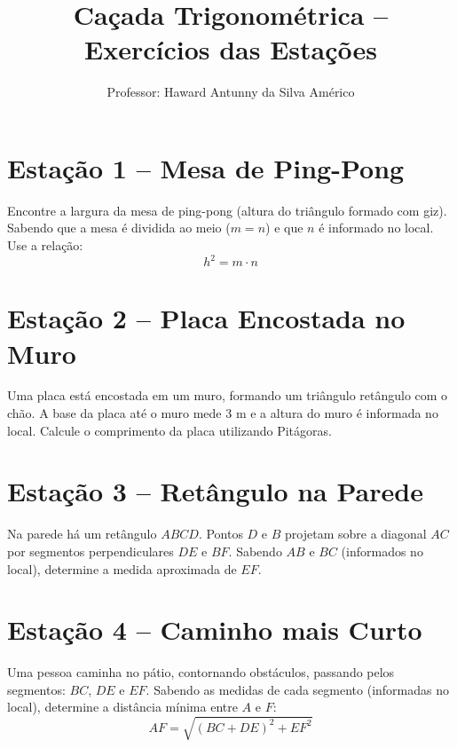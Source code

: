 \documentclass[a4paper,12pt]{article}
\title{\textbf{Caçada Trigonométrica – Exercícios das Estações}}
\author{Professor: Haward Antunny da Silva Américo}
\date{}
\begin{document}
	\maketitle
	
	\begin{multicols}{2}
		
		\section*{Estação 1 – Mesa de Ping-Pong}
		Encontre a largura da mesa de ping-pong (altura do triângulo formado com giz).  
		Sabendo que a mesa é dividida ao meio ($m=n$) e que $n$ é informado no local.  
		Use a relação:  
		\[
		h^2 = m \cdot n
		\]
		
		\vspace{0.5cm}
		
		\section*{Estação 2 – Placa Encostada no Muro}
		Uma placa está encostada em um muro, formando um triângulo retângulo com o chão.  
		A base da placa até o muro mede $3$ m e a altura do muro é informada no local.  
		Calcule o comprimento da placa utilizando Pitágoras.
		
		\vspace{0.5cm}
		
		\section*{Estação 3 – Retângulo na Parede}
		Na parede há um retângulo $ABCD$. Pontos $D$ e $B$ projetam sobre a diagonal $AC$ por segmentos perpendiculares $DE$ e $BF$.  
		Sabendo $AB$ e $BC$ (informados no local), determine a medida aproximada de $EF$.
		
		\vspace{0.5cm}
		
		\section*{Estação 4 – Caminho mais Curto}
		Uma pessoa caminha no pátio, contornando obstáculos, passando pelos segmentos:  
		$BC$, $DE$ e $EF$.  
		Sabendo as medidas de cada segmento (informadas no local), determine a distância mínima entre $A$ e $F$:
		\[
		AF = \sqrt{(BC + DE)^2 + EF^2}
		\]
		
		\vspace{0.5cm}
		

\end{multicols}
\end{document}
